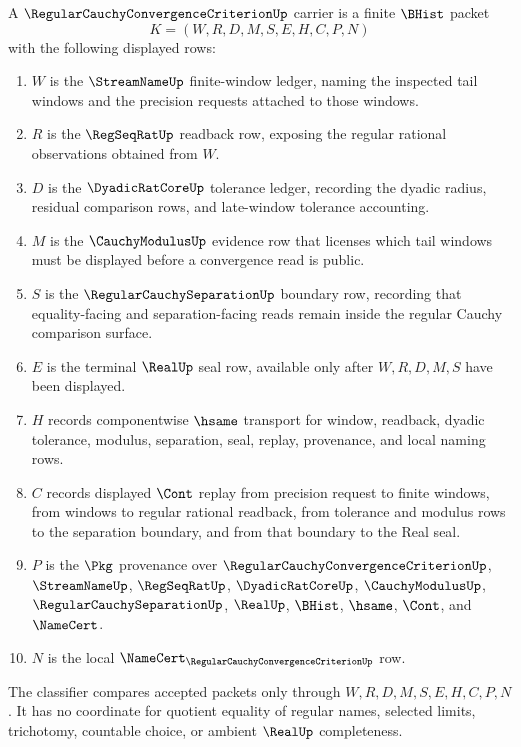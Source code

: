 \begin{definition}
\label{def:regular-cauchy-convergence-criterion-carrier}
A $\RegularCauchyConvergenceCriterionUp$ carrier is a finite $\BHist$ packet
$$
K=(W,R,D,M,S,E,H,C,P,N)
$$
with the following displayed rows:
\begin{enumerate}
\item $W$ is the $\StreamNameUp$ finite-window ledger, naming the inspected tail windows and the precision requests attached to those windows.
\item $R$ is the $\RegSeqRatUp$ readback row, exposing the regular rational observations obtained from $W$.
\item $D$ is the $\DyadicRatCoreUp$ tolerance ledger, recording the dyadic radius, residual comparison rows, and late-window tolerance accounting.
\item $M$ is the $\CauchyModulusUp$ evidence row that licenses which tail windows must be displayed before a convergence read is public.
\item $S$ is the $\RegularCauchySeparationUp$ boundary row, recording that equality-facing and separation-facing reads remain inside the regular Cauchy comparison surface.
\item $E$ is the terminal $\RealUp$ seal row, available only after $W,R,D,M,S$ have been displayed.
\item $H$ records componentwise $\hsame$ transport for window, readback, dyadic tolerance, modulus, separation, seal, replay, provenance, and local naming rows.
\item $C$ records displayed $\Cont$ replay from precision request to finite windows, from windows to regular rational readback, from tolerance and modulus rows to the separation boundary, and from that boundary to the Real seal.
\item $P$ is the $\Pkg$ provenance over $\RegularCauchyConvergenceCriterionUp$, $\StreamNameUp$, $\RegSeqRatUp$, $\DyadicRatCoreUp$, $\CauchyModulusUp$, $\RegularCauchySeparationUp$, $\RealUp$, $\BHist$, $\hsame$, $\Cont$, and $\NameCert$.
\item $N$ is the local $\NameCert_{\RegularCauchyConvergenceCriterionUp}$ row.
\end{enumerate}
The classifier compares accepted packets only through $W,R,D,M,S,E,H,C,P,N$. It has no coordinate for quotient equality of regular names, selected limits, trichotomy, countable choice, or ambient $\RealUp$ completeness.
\end{definition}

